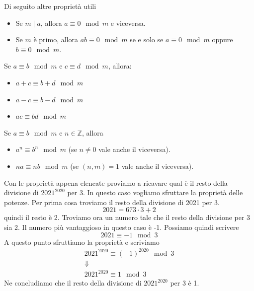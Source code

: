Di seguito altre propriet\`a utili
\begin{itemize}
	\item Se $m \mid a$, allora $a \equiv 0 \mod{m}$ e viceversa.
	\item Se $m$ \`e primo, allora $ab \equiv 0 \mod{m}$ se e solo se $a \equiv 0 \mod{m}$
	      oppure $b \equiv 0 \mod{m}$.
\end{itemize}

Se $a \equiv b \mod{m}$ e $c \equiv d \mod{m}$, allora:
\begin{itemize}
	\item $a + c \equiv b + d \mod{m}$
	\item $a - c \equiv b - d \mod{m}$
	\item $ac \equiv bd \mod{m}$
\end{itemize}

Se $a \equiv b \mod{m}$ e $n \in \mathbb{Z}$, allora
\begin{itemize}
	\item $a^n \equiv b^n \mod{m}$ (se $n \neq 0$ vale anche il viceversa).
	\item $na \equiv nb \mod{m}$ (se $(n, m) = 1$ vale anche il viceversa).
\end{itemize}

\begin{example}
	Con le propriet\`a appena elencate proviamo a ricavare qual \`e il resto della divisione
	di $2021^{2020}$ per $3$.
	In questo caso vogliamo sfruttare la propriet\`a delle potenze. Per prima cosa troviamo
	il resto della divisione di 2021 per 3.
	\begin{equation*}
		2021 = 673 \cdot 3 + 2
	\end{equation*}
	quindi il resto \`e 2. Troviamo ora un numero tale che il resto della divisione per 3
	sia 2. Il numero pi\`u vantaggioso in questo caso \`e -1. Possiamo quindi scrivere
	\begin{equation*}
		2021 \equiv -1 \mod{3}
	\end{equation*}
	A questo punto sfruttiamo la propriet\`a e scriviamo
	\begin{equation*}
		\begin{array}{c}
			2021^{2020} \equiv (-1)^{2020} \mod{3} \\
			\Downarrow                             \\
			2021^{2020} \equiv 1 \mod{3}
		\end{array}
	\end{equation*}
	Ne concludiamo che il resto della divisione di $2021^{2020}$ per 3 \`e 1.
\end{example}

